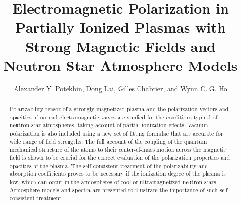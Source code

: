 \documentclass{emulateapj}
\begin{document}
\title{Electromagnetic Polarization in Partially Ionized 
Plasmas with Strong Magnetic Fields
and Neutron Star Atmosphere Models}

\author{Alexander Y. Potekhin,
Dong Lai,
Gilles Chabrier,
and
Wynn C. G. Ho}

\begin{abstract}

Polarizability tensor of a strongly magnetized plasma and the
polarization vectors and opacities of normal electromagnetic waves are
studied for the conditions typical of neutron star atmospheres, taking
account of partial ionization effects. Vacuum polarization is also 
included using a new set of fitting formulae that are accurate for
wide range of field strengths. The full account of the coupling of the
quantum mechanical structure of the atoms to their center-of-mass
motion across the magnetic field is shown to be crucial for the correct
evaluation of the polarization properties and opacities of the plasma.
The self-consistent treatment of the polarizability and absorption
coefficients proves to be necessary if the ionization degree of the
plasma is low, which can occur in the atmospheres of cool or
ultramagnetized neutron stars. 
Atmosphere models and spectra are presented
to illustrate the importance of such self-consistent treatment.

\end{abstract}


\maketitle
\end{document}
